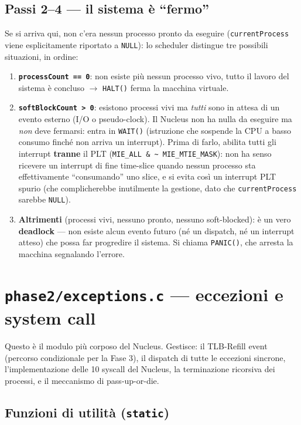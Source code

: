 \documentclass[11pt,a4paper]{article}
\newcommand{\code}[1]{\texttt{#1}}
\begin{document}
\subsection{Passi 2--4 --- il sistema è ``fermo''}
Se si arriva qui, non c'era nessun processo pronto da eseguire
(\code{currentProcess} viene esplicitamente riportato a \code{NULL}): lo
scheduler distingue tre possibili situazioni, in ordine:
\begin{enumerate}
\item \textbf{\code{processCount == 0}}: non esiste più nessun processo
  vivo, tutto il lavoro del sistema è concluso $\to$ \code{HALT()} ferma
  la macchina virtuale.
\item \textbf{\code{softBlockCount > 0}}: esistono processi vivi ma
  \emph{tutti} sono in attesa di un evento esterno (I/O o pseudo-clock).
  Il Nucleus non ha nulla da eseguire ma \emph{non} deve fermarsi: entra in
  \code{WAIT()} (istruzione che sospende la CPU a basso consumo finché non
  arriva un interrupt). Prima di farlo, abilita tutti gli interrupt
  \textbf{tranne} il PLT (\code{MIE\_ALL \& \textasciitilde
  MIE\_MTIE\_MASK}): non ha senso ricevere un interrupt di fine time-slice
  quando nessun processo sta effettivamente ``consumando'' uno slice, e si
  evita così un interrupt PLT spurio (che complicherebbe inutilmente la
  gestione, dato che \code{currentProcess} sarebbe \code{NULL}).
\item \textbf{Altrimenti} (processi vivi, nessuno pronto, nessuno
  soft-blocked): è un vero \textbf{deadlock} --- non esiste alcun evento
  futuro (né un dispatch, né un interrupt atteso) che possa far progredire
  il sistema. Si chiama \code{PANIC()}, che arresta la macchina segnalando
  l'errore.
\end{enumerate}

\section{\code{phase2/exceptions.c} --- eccezioni e system call}

Questo è il modulo più corposo del Nucleus. Gestisce: il TLB-Refill event
(percorso condizionale per la Fase 3), il dispatch di tutte le eccezioni
sincrone, l'implementazione delle 10 syscall del Nucleus, la terminazione
ricorsiva dei processi, e il meccanismo di pass-up-or-die.

\subsection{Funzioni di utilità (\code{static})}
\end{document}
